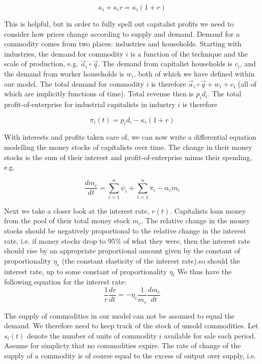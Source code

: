 \documentclass{article}
\theoremstyle{definition}
\begin{document}
\[ \kappa_i+\kappa_ir = \kappa_i(1+r) \]

This is helpful, but in order to fully spell out capitalist profits we need to consider how prices change according to supply and demand. Demand for a commodity comes from two places: industries and households. Starting with industries, the demand for commodity $i$ is a function of the technique and the scale of production, e.g. $\vec{a}_i \circ \vec{q}$. The demand from capitalist households is $c_i$, and the demand from worker households is $w_i$, both of which we have defined within our model. The total demand for commodity $i$ is therefore $\vec{a}_i\circ \vec{q}+w_i+c_i$ (all of which are implicitly functions of time). Total revenue then is $p_id_i$. The total profit-of-enterprise for industrial capitalists in industry $i$ is therefore

\begin{equation}\label{profit-system}
    \pi_i(t) = p_id_i-\kappa_i(1+r)
\end{equation}

With interests and profits taken care of, we can now write a differential equation modelling the money stocks of capitalists over time. The change in their money stocks is the sum of their interest and profit-of-enterprise minus their spending, e.g.

\begin{equation}
    \frac{dm_c}{dt} = \sum_{i=1}^n \psi_i + \sum_{i=1}^n \pi_i - \alpha_cm_c \label{change-in-capitalist-savings}
\end{equation}

Next we take a closer look at the interest rate, $r(t)$. Capitalists loan money from the pool of their total money stock $m_c$. The relative change in the money stocks should be negatively proportional to the relative change in the interest rate, i.e. if money stocks drop to $95\%$ of what they were, then the interest rate should rise by an appropriate proportional amount given by the constant of proportionality $\eta_c$ (the constant elasticity of the interest rate).so should the interest rate, up to some constant of proportionality $\eta_i$
 We thus have the following equation for the interest rate:
 \begin{equation}\label{interest-rate}
    \frac{1}{r}\frac{dr}{dt} = -\eta_c \frac{1}{m_c}\frac{dm_c}{dt}
\end{equation}

The supply of commodities in our model can not be assumed to equal the demand. We therefore need to keep track of the stock of unsold commodities. Let $s_i(t)$ denote the number of units of commodity $i$ available for sale each period. Assume for simplicty that no commodities expire. The rate of change of the supply of a commodity is of course equal to the excess of output over supply, i.e.
\end{document}

